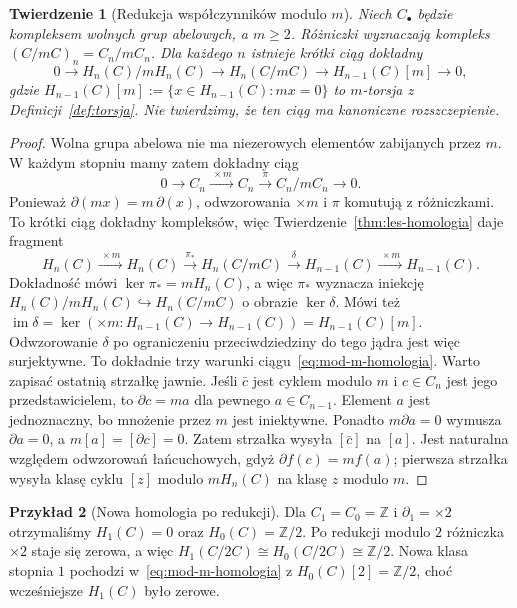 \documentclass[11pt,a4paper,oneside]{report}
\newcommand{\Z}{\mathbb{Z}}
\theoremstyle{plain}
\newtheorem{twierdzenie}{Twierdzenie}[section]
\theoremstyle{definition}
\newtheorem{przyklad}[twierdzenie]{Przykład}
\theoremstyle{remark}
\begin{document}
\begin{twierdzenie}[Redukcja współczynników modulo $m$]
\label{thm:mod-m-homologia}
Niech $C_\bullet$ będzie kompleksem
wolnych grup abelowych, a $m\geq2$.
Różniczki wyznaczają kompleks
$(C/mC)_n=C_n/mC_n$. Dla każdego
$n$ istnieje krótki ciąg dokładny
\begin{equation}\label{eq:mod-m-homologia}
 0\longrightarrow H_n(C)/mH_n(C)
 \longrightarrow H_n(C/mC)
 \longrightarrow H_{n-1}(C)[m]
 \longrightarrow0,
\end{equation}
gdzie $H_{n-1}(C)[m]:=
\{x\in H_{n-1}(C):mx=0\}$
to $m$-torsja z Definicji~\ref{def:torsja}.
Nie twierdzimy, że ten ciąg ma
kanoniczne rozszczepienie.
\end{twierdzenie}
\begin{proof}
Wolna grupa abelowa nie ma
niezerowych elementów zabijanych
przez $m$. W każdym stopniu mamy
zatem dokładny ciąg
\[
 0\to C_n\xrightarrow{\ \times m\ }C_n
 \xrightarrow{\ \pi\ }C_n/mC_n\to0.
\]
Ponieważ $\partial(mx)=m\,\partial(x)$,
odwzorowania $\times m$ i $\pi$
komutują z różniczkami.
To krótki ciąg dokładny
kompleksów, więc
Twierdzenie~\ref{thm:les-homologia}
daje fragment
\[
 H_n(C)\xrightarrow{\ \times m\ }H_n(C)
 \xrightarrow{\ \pi_*\ }H_n(C/mC)
 \xrightarrow{\ \delta\ }H_{n-1}(C)
 \xrightarrow{\ \times m\ }H_{n-1}(C).
\]
Dokładność mówi
$\ker\pi_*=mH_n(C)$, a więc
$\pi_*$ wyznacza iniekcję
$H_n(C)/mH_n(C)\hookrightarrow H_n(C/mC)$
o obrazie $\ker\delta$.
Mówi też
$\operatorname{im}\delta
=\ker(\times m:H_{n-1}(C)\to H_{n-1}(C))
=H_{n-1}(C)[m]$.
Odwzorowanie $\delta$ po ograniczeniu
przeciwdziedziny do tego jądra
jest więc surjektywne.
To dokładnie trzy warunki
ciągu~\eqref{eq:mod-m-homologia}.
Warto zapisać ostatnią strzałkę jawnie. Jeśli $\bar c$ jest cyklem
modulo $m$ i $c\in C_n$ jest jego przedstawicielem, to
$\partial c=ma$ dla pewnego $a\in C_{n-1}$.
Element $a$ jest jednoznaczny, bo mnożenie przez $m$ jest iniektywne.
Ponadto $m\partial a=0$ wymusza $\partial a=0$,
a $m[a]=[\partial c]=0$. Zatem strzałka wysyła $[\bar c]$ na $[a]$.
Jest naturalna względem odwzorowań łańcuchowych, gdyż
$\partial f(c)=mf(a)$; pierwsza strzałka wysyła klasę cyklu
$[z]$ modulo $mH_n(C)$ na klasę $z$ modulo $m$.
\end{proof}

\begin{przyklad}[Nowa homologia po redukcji]
Dla $C_1=C_0=\Z$ i $\partial_1=\times2$
otrzymaliśmy $H_1(C)=0$ oraz
$H_0(C)=\Z/2$. Po redukcji modulo
$2$ różniczka $\times2$ staje się
zerowa, a więc
$H_1(C/2C)\cong H_0(C/2C)\cong\Z/2$.
Nowa klasa stopnia $1$ pochodzi
w~\eqref{eq:mod-m-homologia} z
$H_0(C)[2]=\Z/2$, choć wcześniejsze
$H_1(C)$ było zerowe.
\end{przyklad}
\end{document}

